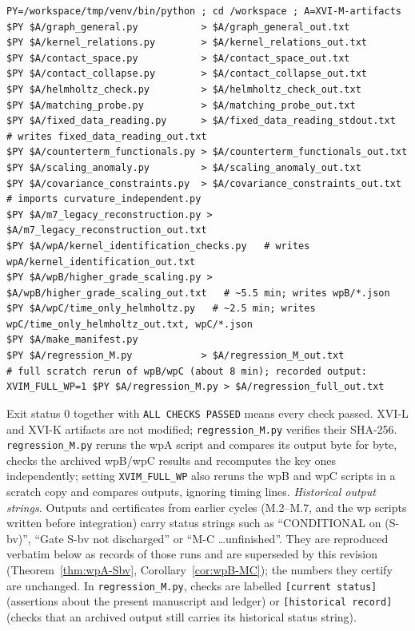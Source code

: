 \documentclass{article}
\theoremstyle{remark}
\begin{document}
\begin{lstlisting}
PY=/workspace/tmp/venv/bin/python ; cd /workspace ; A=XVI-M-artifacts
$PY $A/graph_general.py           > $A/graph_general_out.txt
$PY $A/kernel_relations.py        > $A/kernel_relations_out.txt
$PY $A/contact_space.py           > $A/contact_space_out.txt
$PY $A/contact_collapse.py        > $A/contact_collapse_out.txt
$PY $A/helmholtz_check.py         > $A/helmholtz_check_out.txt
$PY $A/matching_probe.py          > $A/matching_probe_out.txt
$PY $A/fixed_data_reading.py      > $A/fixed_data_reading_stdout.txt   # writes fixed_data_reading_out.txt
$PY $A/counterterm_functionals.py > $A/counterterm_functionals_out.txt
$PY $A/scaling_anomaly.py         > $A/scaling_anomaly_out.txt
$PY $A/covariance_constraints.py  > $A/covariance_constraints_out.txt  # imports curvature_independent.py
$PY $A/m7_legacy_reconstruction.py > $A/m7_legacy_reconstruction_out.txt
$PY $A/wpA/kernel_identification_checks.py   # writes wpA/kernel_identification_out.txt
$PY $A/wpB/higher_grade_scaling.py > $A/wpB/higher_grade_scaling_out.txt   # ~5.5 min; writes wpB/*.json
$PY $A/wpC/time_only_helmholtz.py   # ~2.5 min; writes wpC/time_only_helmholtz_out.txt, wpC/*.json
$PY $A/make_manifest.py
$PY $A/regression_M.py            > $A/regression_M_out.txt
# full scratch rerun of wpB/wpC (about 8 min); recorded output:
XVIM_FULL_WP=1 $PY $A/regression_M.py > $A/regression_full_out.txt
\end{lstlisting}
Exit status $0$ together with \texttt{ALL CHECKS PASSED} means every check passed.
XVI-L and XVI-K artifacts are not modified; \texttt{regression\_M.py} verifies their SHA-256.
\texttt{regression\_M.py} reruns the wpA script and compares its output byte for byte, checks the archived wpB/wpC results and recomputes the key ones independently; setting \texttt{XVIM\_FULL\_WP} also reruns the wpB and wpC scripts in a scratch copy and compares outputs, ignoring timing lines.
\emph{Historical output strings.} Outputs and certificates from earlier cycles (M.2--M.7, and the wp scripts written before integration) carry status strings such as ``CONDITIONAL on (S-bv)'', ``Gate S-bv not discharged'' or ``M-C \dots unfinished''. They are reproduced verbatim below as records of those runs and are superseded by this revision (Theorem~\ref{thm:wpA-Sbv}, Corollary~\ref{cor:wpB-MC}); the numbers they certify are unchanged. In \texttt{regression\_M.py}, checks are labelled \texttt{[current status]} (assertions about the present manuscript and ledger) or \texttt{[historical record]} (checks that an archived output still carries its historical status string).
\end{document}
